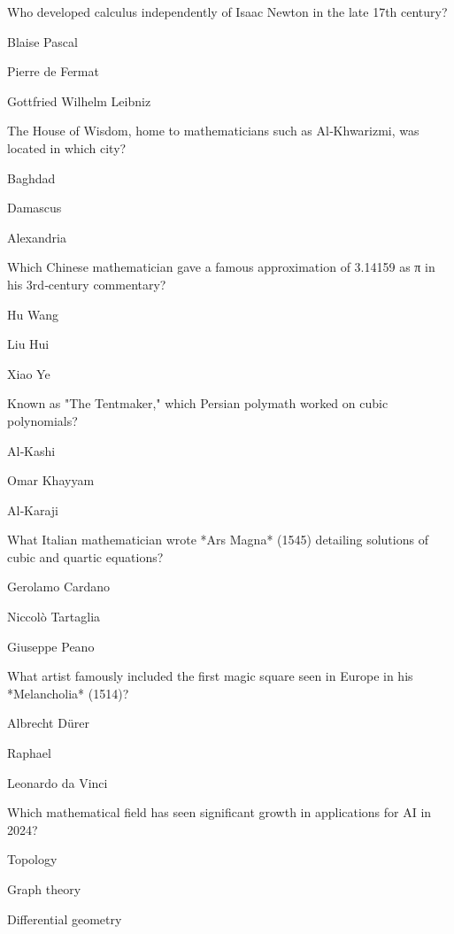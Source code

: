 \begin{enhancedmcq}{Who developed calculus independently of Isaac Newton in the late 17th century?}
\item Blaise Pascal
\item Pierre de Fermat
\item Gottfried Wilhelm Leibniz

\end{enhancedmcq}
\begin{enhancedmcq}{The House of Wisdom, home to mathematicians such as Al‑Khwarizmi, was located in which city?}
\item Baghdad
\item Damascus
\item Alexandria

\end{enhancedmcq}
\begin{enhancedmcq}{Which Chinese mathematician gave a famous approximation of 3.14159 as π in his 3rd‑century commentary?}
\item Hu Wang
\item Liu Hui
\item Xiao Ye

\end{enhancedmcq}
\begin{enhancedmcq}{Known as "The Tentmaker," which Persian polymath worked on cubic polynomials?}
\item Al‑Kashi
\item Omar Khayyam
\item Al‑Karaji

\end{enhancedmcq}
\begin{enhancedmcq}{What Italian mathematician wrote *Ars Magna* (1545) detailing solutions of cubic and quartic equations?}
\item Gerolamo Cardano
\item Niccolò Tartaglia
\item Giuseppe Peano

\end{enhancedmcq}
\begin{enhancedmcq}{What artist famously included the first magic square seen in Europe in his *Melancholia* (1514)?}
\item Albrecht Dürer
\item Raphael
\item Leonardo da Vinci

\end{enhancedmcq}
\begin{enhancedmcq}{Which mathematical field has seen significant growth in applications for AI in 2024?}
\item Topology
\item Graph theory
\item Differential geometry

\end{enhancedmcq}
